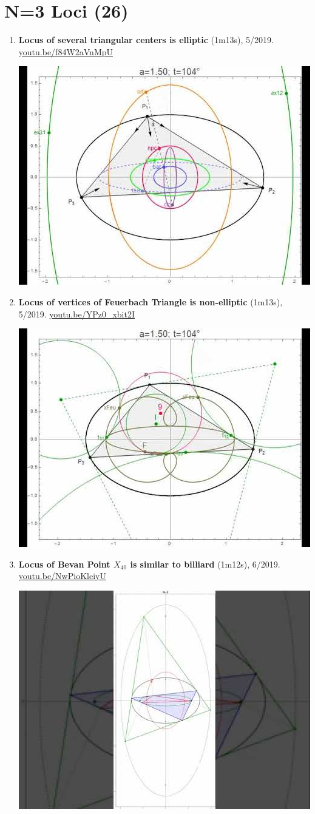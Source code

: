 \documentclass[12pt]{article}
\begin{document}
\section{N=3 Loci (26)}

\begin{enumerate}[resume]
\item \textbf{Locus of several triangular centers is elliptic} (1m13s), 5/2019. \href{https://youtu.be/f84W2aVnMpU}{\url{youtu.be/f84W2aVnMpU}}
\begin{center}\includegraphics[width=.5\textwidth]{pics/f84W2aVnMpU.jpg}\end{center}
% 
\item \textbf{Locus of vertices of Feuerbach Triangle is non-elliptic} (1m13s), 5/2019. \href{https://youtu.be/YPz0_xbit2I}{\url{youtu.be/YPz0\_xbit2I}}
\begin{center}\includegraphics[width=.5\textwidth]{pics/YPz0_xbit2I.jpg}\end{center}
% 
\item \textbf{Locus of Bevan Point $X_{40}$ is similar to billiard} (1m12s), 6/2019. \href{https://youtu.be/NwPioKleiyU}{\url{youtu.be/NwPioKleiyU}}
\begin{center}\includegraphics[width=.5\textwidth]{pics/NwPioKleiyU.jpg}\end{center}

\end{enumerate}
\end{document}
